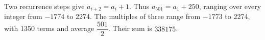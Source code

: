 Two recurrence steps give $a_{i+2}=a_i+1$. Thus $a_{501}=a_1+250$, ranging over every integer from $-1774$ to 2274. The multiples of three range from $-1773$ to 2274, with 1350 terms and average $\dfrac{501}{2}$. Their sum is $\boxed{338175}$.
